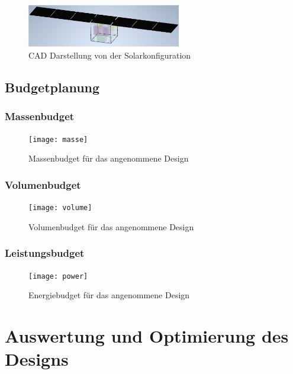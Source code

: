 \begin{figure}[!h]
\centering
	\includegraphics[width=0.60\textwidth]{graphics/Solarpanel.PNG}
	\caption{CAD Darstellung von der Solarkonfiguration \cite{Lettau.}}
	\label{fig:solarpanel}
\end{figure}


				\subsection{Budgetplanung}
				
						\subsubsection{Massenbudget}
								
										\begin{figure}[!h]
											\centering
												\texttt{[image: masse]}
											\caption{Massenbudget für das angenommene Design}
											\label{fig:masse}
										\end{figure}
										
						\subsubsection{Volumenbudget}
								
										\begin{figure}[!h]
											\centering
												\texttt{[image: volume]}
											\caption{Volumenbudget für das angenommene Design}
											\label{fig:volume}
										\end{figure}
								
						\subsubsection{Leistungsbudget}
				
										\begin{figure}[!h]
											\centering
												\texttt{[image: power]}
											\caption{Energiebudget für das angenommene Design}
											\label{fig:power}
										\end{figure}
										
			\section{Auswertung und Optimierung des Designs}

				

